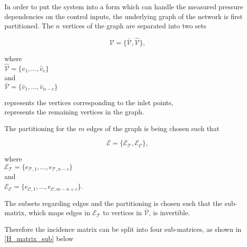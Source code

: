 In order to put the system into a form which can handle the measured pressure dependencies on the control inputs, the underlying graph of the network is first partitioned. The $n$ vertices of the graph are separated into two sets

\begin{equation}
  \label{vertices1}
  \mathcal{V} = \{\bar{\mathcal{V}}, \hat{\mathcal{V}} \}, 
\end{equation}

\begin{minipage}[t]{0.3\textwidth}
where\\
\hspace*{8mm} $\hat{\mathcal{V}} = \{\hat{v}_1, ..., \hat{v}_c\}$\\
\newline
and \\
\hspace*{8mm} $\bar{\mathcal{V}} = \{\bar{v}_1, ..., \bar{v}_{n-c}\}$ 
\end{minipage}
\begin{minipage}[t]{0.55\textwidth}
\vspace*{2mm}
 represents the vertices corresponding to the inlet points,\\
 represents the remaining vertices in the graph.
\end{minipage}

The partitioning for the $m$ edges of the graph is being chosen such that

\begin{equation}
  \label{edges1}
  \mathcal{E} = \{\mathcal{E_{\mathcal{T}}}, \mathcal{E_{\mathcal{C}}} \},
\end{equation}

\begin{minipage}[t]{0.35\textwidth}
where\\
\hspace*{8mm} $\mathcal{E_{\mathcal{T}}} = \{e_{\mathcal{T},1}, ..., e_{\mathcal{T},n-c}\}$\\
and\\
\hspace*{8mm} $\mathcal{E_{\mathcal{C}}} = \{e_{\mathcal{C},1}, ..., e_{\mathcal{C},m-n+c}\}$. 
\end{minipage}

The subsets regarding edges and the partitioning is chosen such that the sub-matrix, which maps edges in $\mathcal{E_{\mathcal{T}}}$ to vertices in $\bar{\mathcal{V}}$, is invertible. 

Therefore the incidence matrix can be split into four sub-matrices, as shown in \eqref{H_matrix_sub} below

